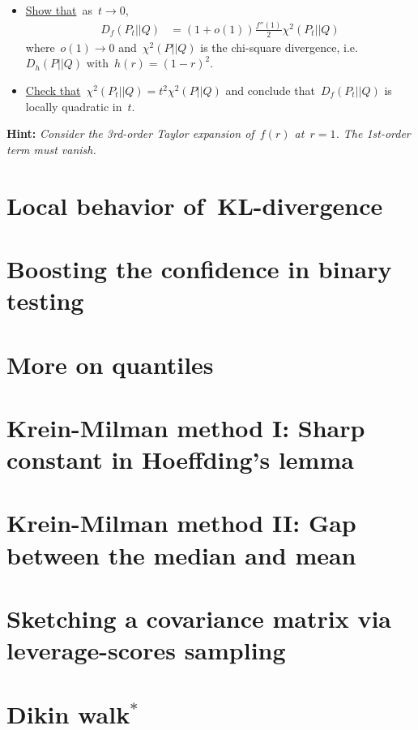 \documentclass[11pt]{article}
\begin{document}
\begin{itemize}
\item
\underline{Show that}~as~$t \to 0$,
\[
\begin{aligned}
D_f(P_t||Q) 
&= (1+o(1)) \frac{f''(1)}{2} \chi^2(P_t||Q)
\end{aligned}
\]
where~$o(1) \to 0$ and~$\chi^2(P||Q)$ is the chi-square divergence, i.e.~$D_{h}(P||Q)$ with~$h(r) = (1-r)^2$.
\item
\underline{Check that}~$\chi^2(P_t||Q) = t^2 \chi^2(P||Q)$ and conclude that~$D_f(P_t||Q)$ is locally quadratic in~$t$.
\end{itemize}

{\bf Hint:} {\em Consider the 3rd-order Taylor expansion of~$f(r)$ at~$r = 1$. The 1st-order term must vanish.}\\

\newpage
\section{Local behavior of~KL-divergence}

\newpage
\section{Boosting the confidence in binary testing}

\newpage
\section{More on quantiles}

\newpage
\section{Krein-Milman method I: Sharp constant in Hoeffding's lemma}

\newpage
\section{Krein-Milman method II: Gap between the median and mean}

\newpage
\section{Sketching a covariance matrix via leverage-scores sampling}

\newpage
\section{Dikin walk$^*$}

\newpage


\newpage


\end{document}
